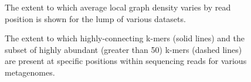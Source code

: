 \documentclass[10pt]{article}
\begin{document}
\begin{figure}
\caption{The extent to which average local graph density varies by read position is shown for the lump of various datasets.}
\end{figure}

\begin{figure}
\caption{The extent to which highly-connecting k-mers (solid lines) and the subset of highly abundant (greater than 50) k-mers (dashed lines) are present at specific positions within sequencing reads for various metagenomes.}
\end{figure}
\end{document}
